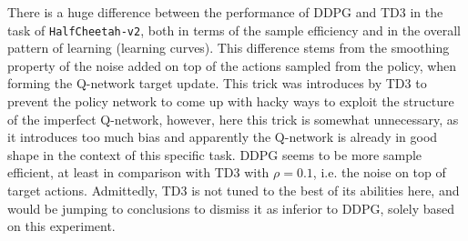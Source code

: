 \documentclass[11pt]{article}
\begin{document}
There is a huge difference between the performance of DDPG and TD3 in the task of \texttt{HalfCheetah-v2}, both in terms of the sample efficiency and in the overall pattern of learning (learning curves). This difference stems from the smoothing property of the noise added on top of the actions sampled from the policy, when forming the Q-network target update. This trick was introduces by TD3 to prevent the policy network to come up with hacky ways to exploit the structure of the imperfect Q-network, however, here this trick is somewhat unnecessary, as it introduces too much bias and apparently the Q-network is already in good shape in the context of this specific task. DDPG seems to be more sample efficient, at least in comparison with TD3 with \(\rho = 0.1\), i.e. the noise on top of target actions. Admittedly, TD3 is not tuned to the best of its abilities here, and would be jumping to conclusions to dismiss it as inferior to DDPG, solely based on this experiment.

\clearpage
\end{document}
